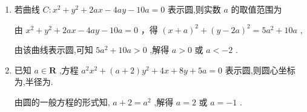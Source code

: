 \begin{enumerate}
    \item 若曲线 $C : {x}^{2} + {y}^{2} + {2ax} - {4ay} - {10a} = 0$ 表示圆,则实数 $a$ 的取值范围为
    \begin{jieda}
        由 ${x}^{2} + {y}^{2} + {2ax} - {4ay} - {10a} = 0$ ，得 ${\left( x + a\right) }^{2} + {\left( y - 2a\right) }^{2} = 5{a}^{2} + {10a}$ ,
        
        由该曲线表示圆,可知 $5{a}^{2} + {10a} > 0$ ,解得 $a > 0$ 或 $a <  - 2$ .
    \end{jieda} 
    \item 已知 $a \in  \mathbf{R}$ ,方程 ${a}^{2}{x}^{2} + \left( {a + 2}\right) {y}^{2} + {4x} + {8y} + {5a} = 0$ 表示圆,则圆心坐标为,半径为.
    \begin{jieda}
        由圆的一般方程的形式知, $a + 2 = {a}^{2}$ ,解得 $a = 2$ 或 $a =  - 1$ .
\end{jieda}
\end{enumerate}

